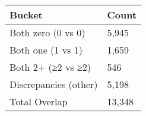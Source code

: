 \begin{tabular}{ll}
\toprule
Bucket & Count \\
\midrule
Both zero (0 vs 0) & 5,945 \\
Both one (1 vs 1) & 1,659 \\
Both 2+ (≥2 vs ≥2) & 546 \\
Discrepancies (other) & 5,198 \\
Total Overlap & 13,348 \\
\bottomrule
\end{tabular}
